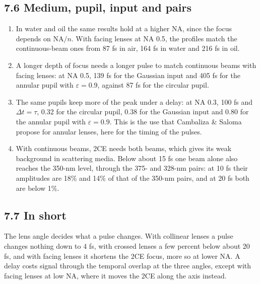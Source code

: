 \documentclass[10pt]{article}
\begin{document}
\subsection*{7.6 Medium, pupil, input and pairs}
\begin{enumerate}
\item In water and oil the same results hold at a higher NA, since the focus depends on $\mathrm{NA}/n$. With
facing lenses at NA 0.5, the profiles match the continuous-beam ones from 87 fs in air, 164 fs in water and
216 fs in oil.
\item A longer depth of focus needs a longer pulse to match continuous beams with facing lenses: at NA 0.5,
139 fs for the Gaussian input and 405 fs for the annular pupil with $\varepsilon = 0.9$, against 87 fs for the
circular pupil.
\item The same pupils keep more of the peak under a delay: at NA 0.3, 100 fs and $\Delta t = \tau$, 0.32 for
the circular pupil, 0.38 for the Gaussian input and 0.80 for the annular pupil with $\varepsilon = 0.9$. This
is the use that Cambaliza \& Saloma propose for annular lenses, here for the timing of the pulses.
\item With continuous beams, 2CE needs both beams, which gives its weak background in scattering media. Below
about 15 fs one beam alone also reaches the 350-nm level, through the 375- and 328-nm pairs: at 10 fs their amplitudes
are 18\% and 14\% of that of the 350-nm pairs, and at 20 fs both are below 1\%.
\end{enumerate}

\subsection*{7.7 In short}
The lens angle decides what a pulse changes. With collinear lenses a pulse changes nothing down to 4 fs, with
crossed lenses a few percent below about 20 fs, and with facing lenses it shortens the 2CE focus, more so at
lower NA. A delay costs signal through the temporal overlap at the three angles, except with facing lenses at
low NA, where it moves the 2CE along the axis instead.
\end{document}
